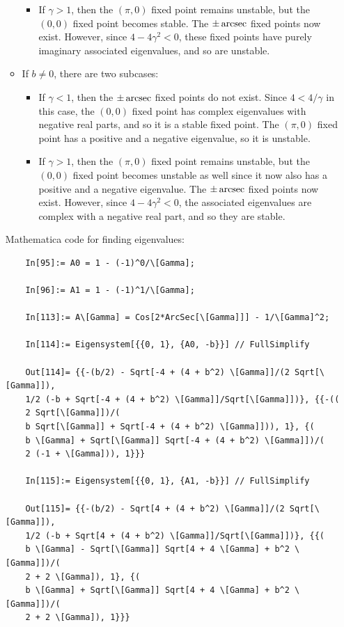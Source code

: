 \documentclass{article}
\theoremstyle{definition}
\begin{document}
\begin{enumerate}[label=(\alph*)]
\begin{itemize}
\begin{itemize}
			\item If $\gamma > 1$, then the $(\pi ,0)$ fixed point remains unstable, but the $(0,0)$ fixed point becomes stable. The $\pm \arcsec$ fixed points now exist. However, since $4-4\gamma^2 < 0$, these fixed points have purely imaginary associated eigenvalues, and so are unstable. 
		\end{itemize}
		
		
		
		
		
		\item If $b\neq 0$, there are two subcases:
		\begin{itemize}
			\item If $\gamma < 1$, then the $\pm \arcsec$ fixed points do not exist. Since $4 <  4/\gamma$ in this case, the $(0,0)$ fixed point has complex eigenvalues with negative real parts, and so it is a stable fixed point.  The $(\pi,0)$ fixed point has a positive and a negative eigenvalue, so it is unstable. 
			
			\item If $\gamma > 1$, then the $(\pi ,0)$ fixed point remains unstable, but the $(0,0)$ fixed point becomes unstable as well since it now also has a positive and a negative eigenvalue. The $\pm \arcsec$ fixed points now exist. However, since $4-4\gamma^2 < 0$, the associated eigenvalues are complex with  a negative real part,  and so they are stable.  
		\end{itemize}
	\end{itemize}
	
	
	Mathematica code for finding eigenvalues:
	\begin{lstlisting}
	In[95]:= A0 = 1 - (-1)^0/\[Gamma];
	
	In[96]:= A1 = 1 - (-1)^1/\[Gamma];
	
	In[113]:= A\[Gamma] = Cos[2*ArcSec[\[Gamma]]] - 1/\[Gamma]^2;
	
	In[114]:= Eigensystem[{{0, 1}, {A0, -b}}] // FullSimplify
	
	Out[114]= {{-(b/2) - Sqrt[-4 + (4 + b^2) \[Gamma]]/(2 Sqrt[\[Gamma]]),
	1/2 (-b + Sqrt[-4 + (4 + b^2) \[Gamma]]/Sqrt[\[Gamma]])}, {{-((
	2 Sqrt[\[Gamma]])/(
	b Sqrt[\[Gamma]] + Sqrt[-4 + (4 + b^2) \[Gamma]])), 1}, {(
	b \[Gamma] + Sqrt[\[Gamma]] Sqrt[-4 + (4 + b^2) \[Gamma]])/(
	2 (-1 + \[Gamma])), 1}}}
	
	In[115]:= Eigensystem[{{0, 1}, {A1, -b}}] // FullSimplify
	
	Out[115]= {{-(b/2) - Sqrt[4 + (4 + b^2) \[Gamma]]/(2 Sqrt[\[Gamma]]), 
	1/2 (-b + Sqrt[4 + (4 + b^2) \[Gamma]]/Sqrt[\[Gamma]])}, {{(
	b \[Gamma] - Sqrt[\[Gamma]] Sqrt[4 + 4 \[Gamma] + b^2 \[Gamma]])/(
	2 + 2 \[Gamma]), 1}, {(
	b \[Gamma] + Sqrt[\[Gamma]] Sqrt[4 + 4 \[Gamma] + b^2 \[Gamma]])/(
	2 + 2 \[Gamma]), 1}}}
	

\end{lstlisting}
\end{enumerate}
\end{document}

